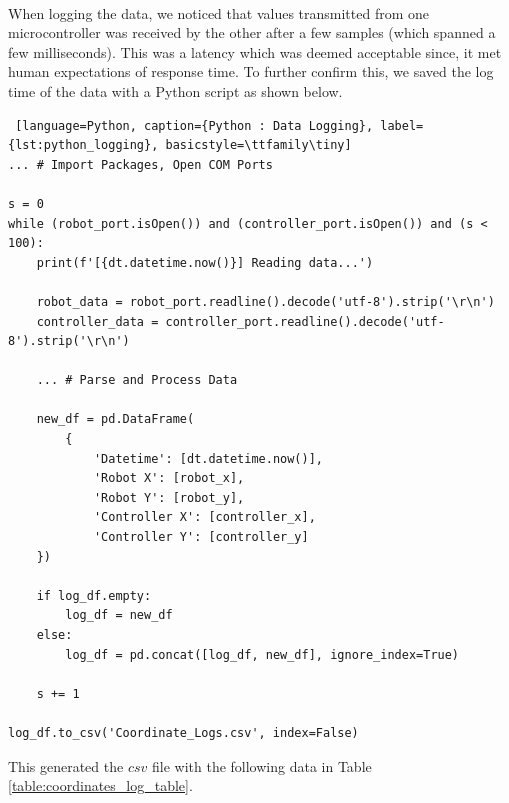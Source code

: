 \documentclass{article}
\begin{document}
\

When logging the data, we noticed that values transmitted from one microcontroller was received by the other after a few samples (which spanned a few milliseconds). This was a latency which
was deemed acceptable since, it met human expectations of response time. To further confirm this, we saved the log time of the data with a Python script as shown below.

\begin{lstlisting} [language=Python, caption={Python : Data Logging}, label={lst:python_logging}, basicstyle=\ttfamily\tiny]
... # Import Packages, Open COM Ports

s = 0
while (robot_port.isOpen()) and (controller_port.isOpen()) and (s < 100):
    print(f'[{dt.datetime.now()}] Reading data...')

    robot_data = robot_port.readline().decode('utf-8').strip('\r\n')
    controller_data = controller_port.readline().decode('utf-8').strip('\r\n')

    ... # Parse and Process Data

    new_df = pd.DataFrame(
        {
            'Datetime': [dt.datetime.now()],
            'Robot X': [robot_x],
            'Robot Y': [robot_y],
            'Controller X': [controller_x],
            'Controller Y': [controller_y]
    })

    if log_df.empty:
        log_df = new_df
    else:
        log_df = pd.concat([log_df, new_df], ignore_index=True)

    s += 1

log_df.to_csv('Coordinate_Logs.csv', index=False)
\end{lstlisting}

This generated the $csv$ file with the following data in Table \ref{table:coordinates_log_table}.
\end{document}

